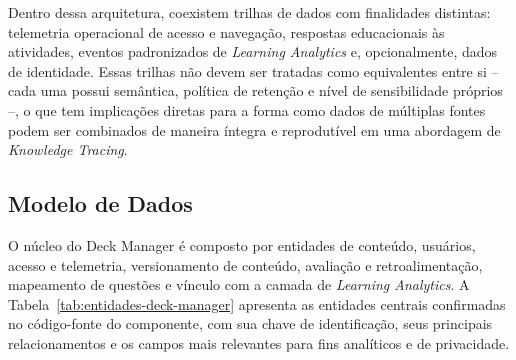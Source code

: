Dentro dessa arquitetura, coexistem trilhas de dados com finalidades
distintas: telemetria operacional de acesso e navegação, respostas
educacionais às atividades, eventos padronizados de \textit{Learning
Analytics} e, opcionalmente, dados de identidade. Essas trilhas não devem
ser tratadas como equivalentes entre si -- cada uma possui semântica,
política de retenção e nível de sensibilidade próprios --, o que tem
implicações diretas para a forma como dados de múltiplas fontes podem ser
combinados de maneira íntegra e reprodutível em uma abordagem de
\textit{Knowledge Tracing}.

\subsection{Modelo de Dados}
\label{subsec:modelo-dados}

O núcleo do Deck Manager é composto por entidades de conteúdo, usuários,
acesso e telemetria, versionamento de conteúdo, avaliação e
retroalimentação, mapeamento de questões e vínculo com a camada de
\textit{Learning Analytics}. A Tabela~\ref{tab:entidades-deck-manager}
apresenta as entidades centrais confirmadas no código-fonte do
componente, com sua chave de identificação, seus principais
relacionamentos e os campos mais relevantes para fins analíticos e de
privacidade.

